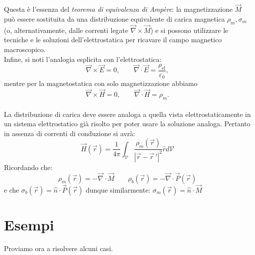 \documentclass{book}
\begin{document}
Questa è l'essenza del \emph{teorema di equivalenza di Ampère}: la magnetizzazione \(\vec{M}\) può essere sostituita da una distribuzione equivalente di carica magnetica \(\rho_m,\sigma_m\) (o, alternativamente, dalle correnti legate \(\vec{\nabla}\times\vec{M}\)) e si possono utilizzare le tecniche e le soluzioni dell'elettrostatica per ricavare il campo magnetico macroscopico.
\\
Infine, si noti l'analogia esplicita con l'elettrostatica:
\[
\vec{\nabla}\times\vec{E}=0,\qquad \vec{\nabla}\cdot\vec{E}=\frac{\rho_{\text{el}}}{\varepsilon_0},
\]
mentre per la magnetostatica con solo magnetizzazione abbiamo
\[
\vec{\nabla}\times\vec{H}=0,\qquad \vec{\nabla}\cdot\vec{H}=\rho_m.
\]
\\
La distribuzione di carica deve essere analoga a quella vista elettrostaticamente in un sistema elettrostatico già risolto per poter usare la soluzione analoga.
Pertanto in assenza di correnti di conduzione si avrà: 
$$
\vec{H}(\vec{r}) = \frac{1}{4\pi}\int_\mathcal{V}\frac{\rho_m (\vec{r})}{|\vec{r}-\vec{r}\,'|^2} \hat{r} d\mathcal{V}
$$
Ricordando che:  
$$
\rho_m(\vec{r}) = - \vec{\nabla}\cdot\vec{M}
\qquad \rho_b (\vec{r}) = -\vec{\nabla}\cdot\vec{P}(\vec{r})
$$
e che $\sigma_b(\vec{r}) = \hat{n}\cdot\vec{P}(\vec{r})$
dunque similarmente:
$\sigma_m(\vec{r}) = \hat{n}\cdot\vec{M}$

\section{Esempi}
Proviamo ora a risolvere alcuni casi.
\end{document}
